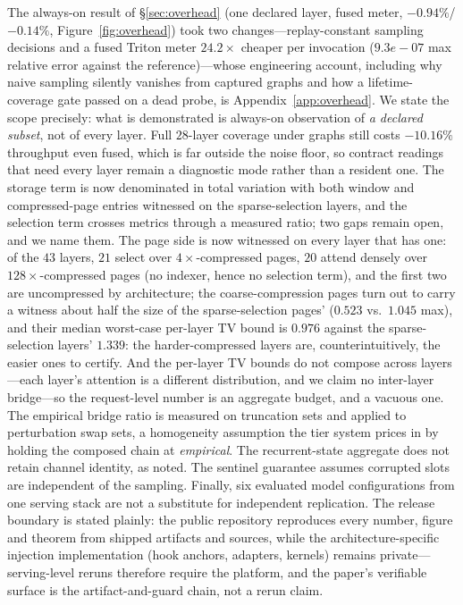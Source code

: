 \documentclass[11pt]{article}
\begin{document}
The always-on result of \S\ref{sec:overhead} (one declared layer,
fused meter, $-0.94\%$/$-0.14\%$, Figure~\ref{fig:overhead}) took two
changes---replay-constant sampling decisions and a fused Triton meter
$24.2\times$ cheaper per invocation ($9.3e-07$ max relative error against
the reference)---whose engineering account, including why naive sampling
silently vanishes from captured graphs and how a lifetime-coverage gate
passed on a dead probe, is Appendix~\ref{app:overhead}. We state the scope precisely: what is demonstrated is always-on
observation of \emph{a declared subset}, not of every layer. Full $28$-layer
coverage under graphs still costs $-10.16\%$ throughput even fused, which is
far outside the noise floor, so contract readings that need every layer remain a
diagnostic mode rather than a resident one. The
storage term is now denominated in total variation with both window and
compressed-page entries witnessed on the sparse-selection layers, and the selection
term crosses metrics through a measured ratio; two gaps remain open, and we name
them. The page side is now witnessed on every layer that has one: of the
$43$ layers, $21$ select over $4\times$-compressed pages, $20$
attend densely over $128\times$-compressed pages (no indexer, hence no
selection term), and the first two are uncompressed by architecture; the
coarse-compression pages turn out to carry a witness about half the size of the
sparse-selection pages' ($0.523$ vs.\ $1.045$ max), and their median
worst-case per-layer TV bound is $0.976$ against the sparse-selection
layers' $1.339$: the harder-compressed layers are, counterintuitively, the
easier ones to certify. And the per-layer TV bounds do not compose
across layers---each layer's attention is a different distribution, and we claim no
inter-layer bridge---so the request-level number is an aggregate budget, and a
vacuous one. The empirical bridge ratio is measured on truncation sets and applied
to perturbation swap sets, a homogeneity assumption the tier system prices in by
holding the composed chain at \emph{empirical}. The
recurrent-state aggregate does not retain channel identity, as noted. The sentinel
guarantee assumes corrupted slots are independent of the sampling. Finally, six evaluated model
configurations from one serving stack are not a substitute for independent
replication. The release boundary is stated plainly: the public repository
reproduces every number, figure and theorem from shipped artifacts and
sources, while the architecture-specific injection implementation (hook
anchors, adapters, kernels) remains private---serving-level reruns
therefore require the platform, and the paper's verifiable surface is the
artifact-and-guard chain, not a rerun claim.
\end{document}
